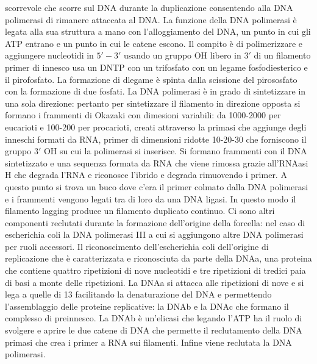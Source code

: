 scorrevole che scorre sul DNA durante la duplicazione consentendo alla DNA polimerasi di rimanere attaccata al DNA. La funzione della DNA polimerasi \`e legata alla sua struttura a mano
con l'alloggiamento del DNA, un punto in cui gli ATP entrano e un punto in cui le catene escono. Il compito \`e di polimerizzare e aggiungere nucleotidi in $5'-3'$ usando un gruppo OH
libero in $3'$ di un filamento primer di innesco usa un DNTP con un trifosfato con un legame fosfodiesterico e il pirofosfato. La formazione di dlegame \`e spinta dalla scissione del
pirososfato con la formazione di due fosfati. La DNA polimerasi \`e in grado di sintetizzare in una sola direzione: pertanto per sintetizzare il filamento in direzione opposta si 
formano i frammenti di Okazaki con dimesioni variabili: da 1000-2000 per eucarioti e 100-200 per procarioti, creati attraverso la primasi che aggiunge degli inneschi formati da RNA, 
primer di dimensioni ridotte 10-20-30 che forniscono il gruppo $3'$ OH su cui la polimerasi si inserisce. Si formano frammenti con il DNA sintetizzato e una sequenza formata da RNA che
viene rimossa grazie all'RNAasi H che degrada l'RNA e riconosce l'ibrido e degrada rimuovendo i primer. A questo punto si trova un buco dove c'era il primer colmato dalla DNA polimerasi
e i frammenti vengono legati tra di loro da una DNA ligasi. In questo modo il filamento lagging produce un filamento duplicato continuo. Ci sono altri componenti reclutati durante la 
formazione dell'origine della forcella: nel caso di escherichia coli la DNA polimerasi III a cui si aggiungono altre DNA polimerasi per ruoli accessori. Il riconoscimento dell'escherichia
coli dell'origine di replicazione che \`e caratterizzata e riconosciuta da parte della DNAa, una proteina che contiene quattro ripetizioni di nove nucleotidi e tre ripetizioni di tredici
paia di basi a monte delle ripetizioni. La DNAa si attacca alle ripetizioni di nove e si lega a quelle di 13 facilitando la denaturazione del DNA e permettendo l'assemblaggio delle
proteine replicative: la DNAb e la DNAc che formano il complesso di preinnesco. La DNAb \`e un'elicasi che legando l'ATP ha il ruolo di svolgere e aprire le due catene di DNA che permette
il reclutamento della DNA primasi che crea i primer a RNA sui filamenti. Infine viene reclutata la DNA polimerasi. 

